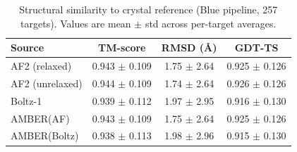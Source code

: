 \begin{table}[htbp]
\centering
\caption{Structural similarity to crystal reference (Blue pipeline, 257 targets). Values are mean $\pm$ std across per-target averages.}
\label{tab:pre-rosetta-blue}
\begin{tabular}{lccc}
\toprule
Source & TM-score & RMSD (\AA) & GDT-TS \\
\midrule
  AF2 (relaxed) & 0.943 $\pm$ 0.109 & 1.75 $\pm$ 2.64 & 0.925 $\pm$ 0.126 \\
  AF2 (unrelaxed) & 0.944 $\pm$ 0.109 & 1.74 $\pm$ 2.64 & 0.926 $\pm$ 0.126 \\
  Boltz-1 & 0.939 $\pm$ 0.112 & 1.97 $\pm$ 2.95 & 0.916 $\pm$ 0.130 \\
  AMBER(AF) & 0.943 $\pm$ 0.109 & 1.75 $\pm$ 2.64 & 0.925 $\pm$ 0.126 \\
  AMBER(Boltz) & 0.938 $\pm$ 0.113 & 1.98 $\pm$ 2.96 & 0.915 $\pm$ 0.130 \\
\bottomrule
\end{tabular}
\end{table}